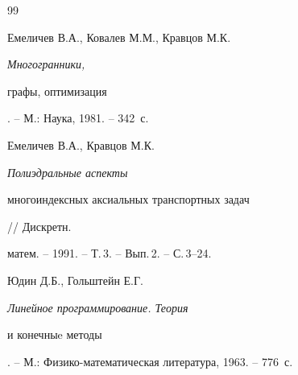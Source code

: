 \begin{thebibliography}{99}


Емеличев В.А., Ковалев М.М., Кравцов М.К. {\em Многогранники,


графы, оптимизация}. -- М.: Наука, 1981. -- 342~с.




Емеличев В.А., Кравцов М.К. {\em Полиэдральные аспекты


многоиндексных аксиальных транспортных задач} // Дискретн.


матем. -- 1991. -- Т.\,3. -- Вып.\,2. -- С.\,3--24.




Юдин Д.Б., Гольштейн Е.Г. {\em Линейное программирование. Теория


и конечныe методы}. -- М.: Физико-математическая литература, 1963. -- 776~с.





\end{thebibliography}





\vskip 0.5cm












\label{end}





